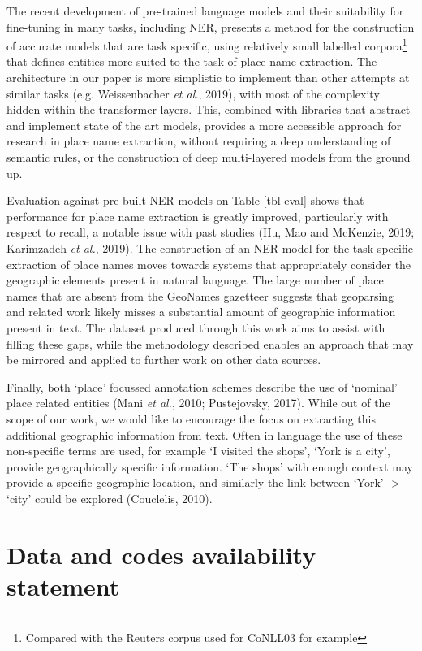 \documentclass[
  letterpaper,
  11pt,
  english,
  onehalfspacing,
  headsepline]{MastersDoctoralThesis}
\begin{document}
The recent development of pre-trained language models and their
suitability for fine-tuning in many tasks, including NER, presents a
method for the construction of accurate models that are task specific,
using relatively small labelled corpora\footnote{Compared with the
  Reuters corpus used for CoNLL03 for example} that defines entities
more suited to the task of place name extraction. The architecture in
our paper is more simplistic to implement than other attempts at similar
tasks (e.g. Weissenbacher \emph{et al.}, 2019), with most of the
complexity hidden within the transformer layers. This, combined with
libraries that abstract and implement state of the art models, provides
a more accessible approach for research in place name extraction,
without requiring a deep understanding of semantic rules, or the
construction of deep multi-layered models from the ground up.

Evaluation against pre-built NER models on Table \ref{tbl-eval} shows
that performance for place name extraction is greatly improved,
particularly with respect to recall, a notable issue with past studies
(Hu, Mao and McKenzie, 2019; Karimzadeh \emph{et al.}, 2019). The
construction of an NER model for the task specific extraction of place
names moves towards systems that appropriately consider the geographic
elements present in natural language. The large number of place names
that are absent from the GeoNames gazetteer suggests that geoparsing and
related work likely misses a substantial amount of geographic
information present in text. The dataset produced through this work aims
to assist with filling these gaps, while the methodology described
enables an approach that may be mirrored and applied to further work on
other data sources.

Finally, both `place' focussed annotation schemes describe the use of
`nominal' place related entities (Mani \emph{et al.}, 2010; Pustejovsky,
2017). While out of the scope of our work, we would like to encourage
the focus on extracting this additional geographic information from
text. Often in language the use of these non-specific terms are used,
for example `I visited the shops', `York is a city', provide
geographically specific information. `The shops' with enough context may
provide a specific geographic location, and similarly the link between
`York' -\textgreater{} `city' could be explored (Couclelis, 2010).

\hypertarget{data-and-codes-availability-statement}{%
\section*{Data and codes availability
statement}\label{data-and-codes-availability-statement}}
\end{document}

